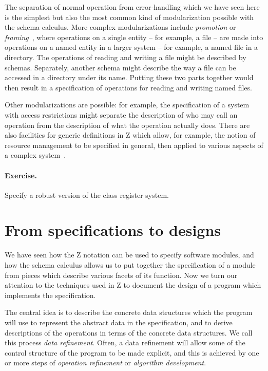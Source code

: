 \documentclass[12pt]{article}
\begin{document}
The separation of normal operation from error-handling which we
have seen here is the simplest but also the most common kind of
modularization possible with the schema calculus.
More complex modularizations include {\em promotion} or
{\em framing}~\cite{UNIX}, where operations
on a single entity -- for example, a file -- are made into
operations on a named entity in a larger system -- for example, a
named file in a directory.
The operations of reading and writing a file might be described by
schemas. Separately, another schema might describe the way a file can
be accessed in a directory under its name. Putting these two parts
together would then result in a specification of operations for
reading and writing named files.

Other modularizations are possible: for example, the
specification of a system with access restrictions might separate the
description of who may call an operation from the description of what
the operation actually does.
There are also facilities for generic definitions in Z which allow, for
example, the notion of resource management to be specified in general,
then applied to various aspects of a complex system~\cite{CAVIAR}.

\paragraph{Exercise.}
Specify a robust version of the class register system.

\section{From specifications to designs}

We have seen how the Z notation can be used to specify software modules,
and how the schema calculus allows us to put together the specification
of a module from pieces which describe various facets of its function.
Now we turn our attention to the techniques used in Z to document the design
of a program which implements the specification.

The central idea is to describe the concrete data structures which the
program will use to represent the abstract data in the specification,
and to derive descriptions of the operations in terms of the concrete
data structures. We call this process {\em data refinement}.  Often, a
data refinement will allow some of the control structure of the
program to be made explicit, and this is achieved by one or more steps
of {\em operation refinement\/} or {\em algorithm development}.
\end{document}
